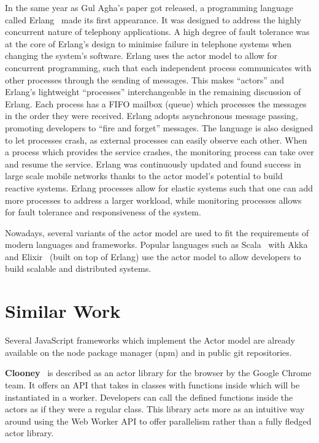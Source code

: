 \documentclass[12pt, a4paper]{report}
\theoremstyle{definition}
\theoremstyle{definition}%
\theoremstyle{definition}%
\theoremstyle{definition}%
\theoremstyle{definition}%
\theoremstyle{definition}%
\begin{document}
In the same year as Gul Agha’s paper got released, a programming language called Erlang~\cite{erlang} made its first appearance. It was designed to address the highly concurrent nature of telephony applications. A high degree of fault tolerance was at the core of Erlang’s design to minimise failure in telephone systems when changing the system’s software. Erlang uses the actor model to allow for concurrent programming, such that each independent process communicates with other processes through the sending of messages. This makes “actors” and Erlang’s lightweight “processes” interchangeable in the remaining discussion of Erlang. Each process has a FIFO mailbox (queue) which processes the messages in the order they were received. Erlang adopts asynchronous message passing, promoting developers to “fire and forget” messages. The language is also designed to let processes crash, as external processes can easily observe each other. When a process which provides the service crashes, the monitoring process can take over and resume the service. Erlang was continuously updated and found success in large scale mobile networks thanks to the actor model’s potential to build reactive systems\cite{reactivemanifesto}. Erlang processes allow for elastic systems such that one can add more processes to address a larger workload, while monitoring processes allows for fault tolerance and responsiveness of the system. 

Nowadays, several variants of the actor model are used to fit the requirements of modern languages and frameworks. Popular languages such as Scala~\cite{scala} with Akka~\cite{akka} and Elixir~\cite{elixir} (built on top of Erlang) use the actor model to allow developers to build scalable and distributed systems.

\section{Similar Work}
Several JavaScript frameworks which implement the Actor model are already available on the node package manager (npm) and in public git repositories.

\textbf{Clooney}~\cite{clooney} is described as an actor library for the browser by the Google Chrome team. It offers an API that takes in classes with functions inside which will be instantiated in a worker. Developers can call the defined functions inside the actors as if they were a regular class. This library acts more as an intuitive way around using the Web Worker API to offer parallelism rather than a fully fledged actor library. 
\end{document}
